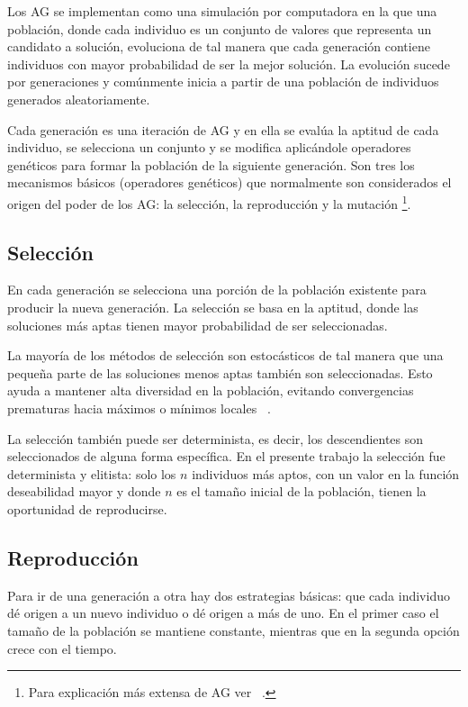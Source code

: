Los AG se implementan como una simulaci\'on por computadora en la que una 
poblaci\'on, donde cada individuo es un conjunto de valores que representa un
candidato a soluci\'on, evoluciona de tal manera que cada generaci\'on contiene
individuos con mayor probabilidad de ser la mejor soluci\'on. La evoluci\'on 
sucede por generaciones y com\'unmente inicia a partir de una poblaci\'on de 
individuos generados aleatoriamente. 

Cada generaci\'on es una iteraci\'on de AG 
y en ella se eval\'ua la aptitud de cada individuo, se selecciona un conjunto y 
se modifica aplic\'andole operadores gen\'eticos para formar la poblaci\'on de 
la siguiente generaci\'on. Son tres los mecanismos b\'asicos (operadores 
gen\'eticos) que normalmente son considerados el origen del poder de los AG: 
la selecci\'on, la reproducci\'on y la mutaci\'on \footnote{Para explicaci\'on
m\'as extensa de AG ver ~\cite{Kur199901}.}.

\subsection{Selecci\'on}
En cada generaci\'on se selecciona una porci\'on de la poblaci\'on existente 
para producir la nueva generaci\'on. La selecci\'on se basa en la aptitud, donde
las soluciones m\'as aptas tienen mayor probabilidad de ser seleccionadas. 

La mayor\'ia de los m\'etodos de selecci\'on son estoc\'asticos de tal manera 
que una peque\~na parte de las soluciones menos aptas tambi\'en son 
seleccionadas. Esto ayuda a mantener alta diversidad en la poblaci\'on, evitando
convergencias prematuras hacia m\'aximos o m\'inimos locales ~\cite{Kur199901}.
 
La selecci\'on tambi\'en puede ser determinista, es decir, los descendientes son
seleccionados de alguna forma espec\'ifica. En el presente trabajo la 
selecci\'on fue determinista y elitista: solo los $n$ individuos m\'as aptos, 
con un valor en la funci\'on deseabilidad mayor y donde $n$ es el tama\~no
inicial de la poblaci\'on, tienen la oportunidad de reproducirse. 

\subsection{Reproducci\'on}
Para ir de una generaci\'on a otra hay dos estrategias b\'asicas: que cada
individuo d\'e origen a un nuevo individuo o d\'e origen a m\'as de uno. En el 
primer caso el tama\~no de la poblaci\'on se mantiene constante, mientras que en
la segunda opci\'on crece con el tiempo.

